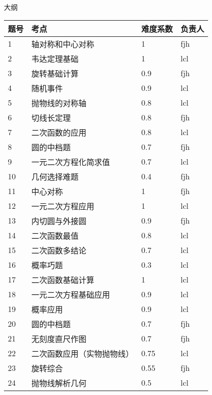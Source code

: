 \documentclass[10pt]{article}
\begin{document}
\centerline{\Large 大纲}
\begin{table}[!htb]
    \centering
    \begin{tabularx}{0.8\textwidth}{p{}<{\centering}p{}<{\centering}p{}<{\centering}p{}<{\centering}} \toprule
        题号 & 考点 & 难度系数 & 负责人 \\ \hline
        1 & 轴对称和中心对称 & 1 & fjh \\ \hline
        2 & 韦达定理基础 & 1 & lcl \\ \hline
        3 & 旋转基础计算 & 0.9 & fjh \\ \hline
        4 & 随机事件 & 0.9 & lcl \\ \hline
        5 & 抛物线的对称轴 & 0.8 & lcl \\ \hline
        6 & 切线长定理 & 0.8 & fjh \\ \hline
        7 & 二次函数的应用 & 0.8 & lcl \\ \hline
        8 & 圆的中档题 & 0.7 & fjh \\ \hline
        9 & 一元二次方程化简求值 & 0.7 & lcl \\ \hline
        10 & 几何选择难题 & 0.4 & fjh \\ \hline
        11 & 中心对称 & 1 & fjh \\ \hline
        12 & 一元二次方程应用 & 1 & lcl \\ \hline
        13 & 内切圆与外接圆 & 0.9 & fjh \\ \hline
        14 & 二次函数最值 & 0.8 & lcl \\ \hline
        15 & 二次函数多结论 & 0.7 & lcl \\ \hline
        16 & 概率巧题 & 0.3 & lcl \\ \hline
        17 & 二次函数基础计算 & 1 & lcl \\ \hline
        18 & 一元二次方程基础应用 & 0.9 & lcl \\ \hline
        19 & 概率应用 & 0.9 & lcl \\ \hline
        20 & 圆的中档题 & 0.7 & fjh \\ \hline
        21 & 无刻度直尺作图 & 0.7 & fjh \\ \hline
        22 & 二次函数应用（实物抛物线）& 0.75 & lcl \\ \hline
        23 & 旋转综合 & 0.55 & fjh \\ \hline
        24 & 抛物线解析几何 & 0.5 & lcl \\ \bottomrule
    \end{tabularx}
\end{table}
\end{document}
